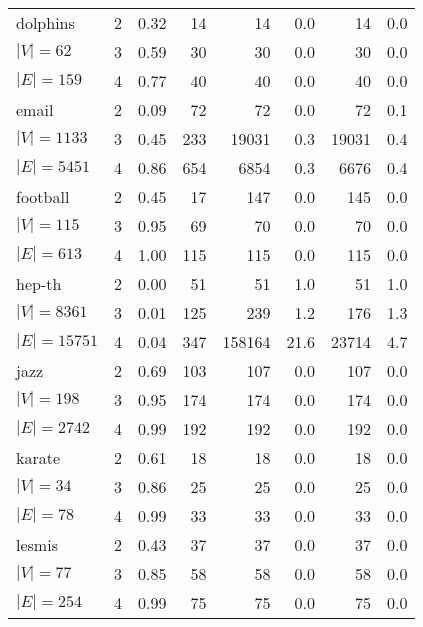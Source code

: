 \documentclass[letterpaper]{article}
\begin{document}
\begin{table}
\begin{tabular}{l c rr rr rr}
dolphins  & 2&0.32&14&14&0.0&14&0.0\\
\hspace*{0.2em}\color{gray}$|V|{=}62$& 3&0.59&30&30&0.0&30&0.0\\
\hspace*{0.2em}\color{gray}$|E|{=}159$& 4&0.77&40&40&0.0&40&0.0\\
email  & 2&0.09&72&72&0.0&72&0.1\\
\hspace*{0.2em}\color{gray}$|V|{=}1133$& 3&0.45&233&19031&0.3&19031&0.4\\
\hspace*{0.2em}\color{gray}$|E|{=}5451$& 4&0.86&654&6854&0.3&6676&0.4\\
football  & 2&0.45&17&147&0.0&145&0.0\\
\hspace*{0.2em}\color{gray}$|V|{=}115$& 3&0.95&69&70&0.0&70&0.0\\
\hspace*{0.2em}\color{gray}$|E|{=}613$& 4&1.00&115&115&0.0&115&0.0\\
hep-th  & 2&0.00&51&51&1.0&51&1.0\\
\hspace*{0.2em}\color{gray}$|V|{=}8361$& 3&0.01&125&239&1.2&176&1.3\\
\hspace*{0.2em}\color{gray}$|E|{=}15751$& 4&0.04&347&158164&21.6&23714&4.7\\
jazz  & 2&0.69&103&107&0.0&107&0.0\\
\hspace*{0.2em}\color{gray}$|V|{=}198$& 3&0.95&174&174&0.0&174&0.0\\
\hspace*{0.2em}\color{gray}$|E|{=}2742$& 4&0.99&192&192&0.0&192&0.0\\
karate  & 2&0.61&18&18&0.0&18&0.0\\
\hspace*{0.2em}\color{gray}$|V|{=}34$& 3&0.86&25&25&0.0&25&0.0\\
\hspace*{0.2em}\color{gray}$|E|{=}78$& 4&0.99&33&33&0.0&33&0.0\\
lesmis  & 2&0.43&37&37&0.0&37&0.0\\
\hspace*{0.2em}\color{gray}$|V|{=}77$& 3&0.85&58&58&0.0&58&0.0\\
\hspace*{0.2em}\color{gray}$|E|{=}254$& 4&0.99&75&75&0.0&75&0.0\\

\end{tabular}
\end{table}
\end{document}

